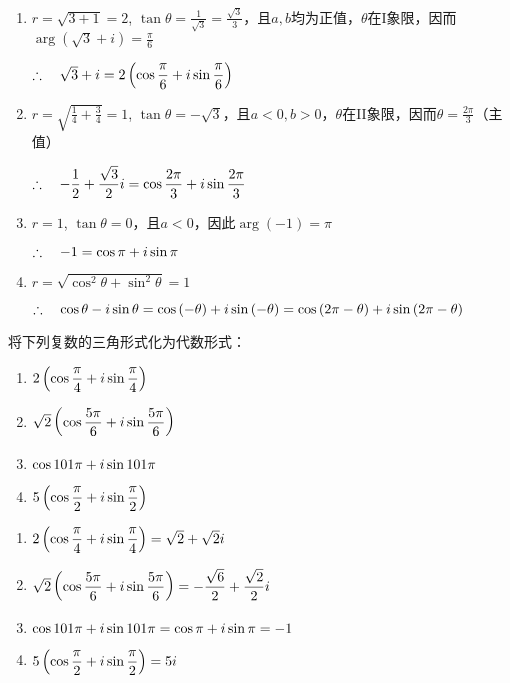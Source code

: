 \begin{solution}
\begin{enumerate}[(1)]
    \item $r=\sqrt{3+1}=2$, $\tan\theta=\frac{1}{\sqrt{3}}=\frac{\sqrt{3}}{3}$，且$a,b$均为正值，$\theta$在I象限，因而$\arg(\sqrt{3}
    +i)=\frac{\pi}{6}$

    $\therefore\quad \sqrt{3}+i=2\left(\cos{\dfrac{\pi}{6}}+i\sin{\dfrac{\pi}{6}}\right)$
\item $r=\sqrt{\frac{1}{4}+\frac{3}{4}}=1$, $\tan\theta=-\sqrt{3}$，且$a<0, b>0$，$\theta$在II象限，因而$\theta=\frac{2\pi}{3}$（主值）

$\therefore\quad -\dfrac{1}{2}+\dfrac{\sqrt{3}}{2}i=\cos{\dfrac{2\pi}{3}}+i\sin{\dfrac{2\pi}{3}}$

\item $r=1$, $\tan\theta =0$，且$a<0$，因此$\arg(-1)=\pi$

$\therefore\quad -1=\cos{\pi}+i\sin{\pi}$

\item $r=\sqrt{\cos^2\theta+\sin^2\theta}=1$

$\therefore\quad \cos\theta-i\sin\theta=\cos\left(-\theta\right)+i\sin\left(-\theta\right)=\cos\left(2\pi-\theta\right)+i\sin\left(2\pi-\theta\right)$

\end{enumerate}
\end{solution}


\begin{example}
    将下列复数的三角形式化为代数形式：
\begin{multicols}{2}
\begin{enumerate}[(1)]
    \item $2\left(\cos{\dfrac{\pi}{4}}+i\sin{\dfrac{\pi}{4}}\right)$
    \item $\sqrt{2}\left(\cos{\dfrac{5\pi}{6}}+i\sin{\dfrac{5\pi}{6}}\right)$
    \item $\cos{101\pi}+i\sin{101\pi}$
    \item $5\left(\cos{\dfrac{\pi}{2}}+i\sin{\dfrac{\pi}{2}}\right)$
\end{enumerate}    
\end{multicols}
\end{example}

\begin{solution}
\begin{enumerate}[(1)]
    \item $2\left(\cos{\dfrac{\pi}{4}}+i\sin{\dfrac{\pi}{4}}\right)=\sqrt{2}+\sqrt{2}i$
    \item $\sqrt{2}\left(\cos{\dfrac{5\pi}{6}}+i\sin{\dfrac{5\pi}{6}}\right)=-\dfrac{\sqrt{6}}{2}+\dfrac{\sqrt{2}}{2}i$
    \item $\cos{101\pi}+i\sin{101\pi}=\cos{\pi}+i\sin{\pi}=-1$
    \item $5\left(\cos{\dfrac{\pi}{2}}+i\sin{\dfrac{\pi}{2}}\right)=5i$
\end{enumerate}  
\end{solution}

